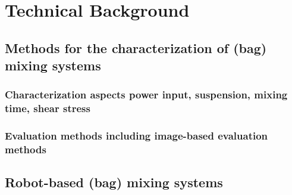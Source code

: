\chapter{Technical Background}
\section{Methods for the characterization of (bag) mixing systems}
\subsection{Characterization aspects \- power input, suspension, mixing time, shear stress}
\subsection{Evaluation methods \- including image-based evaluation methods}
\section{Robot-based (bag) mixing systems}
